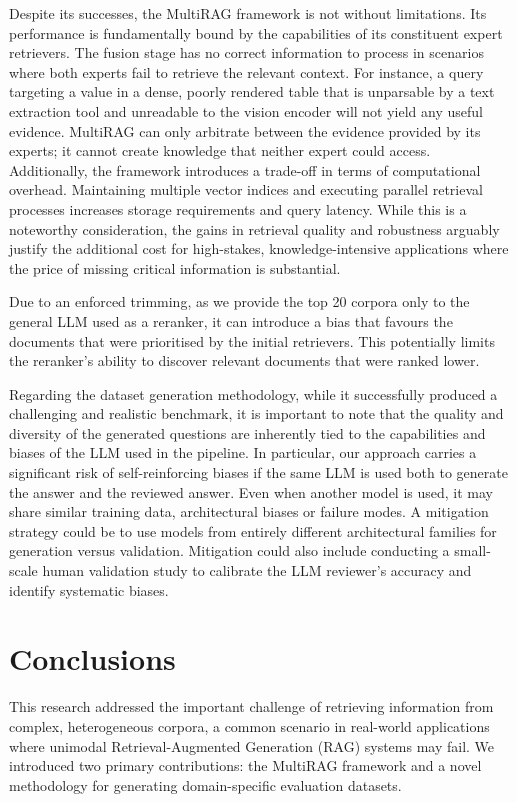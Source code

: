 \documentclass[12pt,twoside]{report}
\begin{document}
Despite its successes, the MultiRAG framework is not without limitations. Its performance is fundamentally bound by the capabilities of its constituent expert retrievers. The fusion stage has no correct information to process in scenarios where both experts fail to retrieve the relevant context. For instance, a query targeting a value in a dense, poorly rendered table that is unparsable by a text extraction tool and unreadable to the vision encoder will not yield any useful evidence. MultiRAG can only arbitrate between the evidence provided by its experts; it cannot create knowledge that neither expert could access. Additionally, the framework introduces a trade-off in terms of computational overhead. Maintaining multiple vector indices and executing parallel retrieval processes increases storage requirements and query latency. While this is a noteworthy consideration, the gains in retrieval quality and robustness arguably justify the additional cost for high-stakes, knowledge-intensive applications where the price of missing critical information is substantial.

Due to an enforced trimming, as we provide the top 20 corpora only to the general LLM used as a reranker, it can introduce a bias that favours the documents that were prioritised by the initial retrievers. This potentially limits the reranker's ability to discover relevant documents that were ranked lower.

Regarding the dataset generation methodology, while it successfully produced a challenging and realistic benchmark, it is important to note that the quality and diversity of the generated questions are inherently tied to the capabilities and biases of the LLM used in the pipeline. In particular, our approach carries a significant risk of self-reinforcing biases if the same LLM is used both to generate the answer and the reviewed answer. Even when another model is used, it may share similar training data, architectural biases or failure modes. A mitigation strategy could be to use models from entirely different architectural families for generation versus validation. Mitigation could also include conducting a small-scale human validation study to calibrate the LLM reviewer's accuracy and identify systematic biases.

\section{Conclusions}

This research addressed the important challenge of retrieving information from complex, heterogeneous corpora, a common scenario in real-world applications where unimodal Retrieval-Augmented Generation (RAG) systems may fail. We introduced two primary contributions: the MultiRAG framework and a novel methodology for generating domain-specific evaluation datasets.
\end{document}
